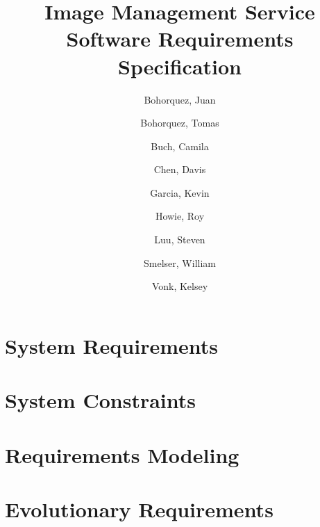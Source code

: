 \documentclass{article}
\begin{document}
\title{
  Image Management Service\\
  \large Software Requirements Specification
}
\author{
       Bohorquez, Juan
  \and Bohorquez, Tomas
  \and Buch, Camila
  \and Chen, Davis
  \and Garcia, Kevin
  \and Howie, Roy
  \and Luu, Steven
  \and Smelser, William
  \and Vonk, Kelsey
}
\date{}
\maketitle

\clearpage
  \tableofcontents

\clearpage
  \listoffigures
  \listoftables

\clearpage
\section{System Requirements}
  

\clearpage
\section{System Constraints}
  

\clearpage
\section{Requirements Modeling}
  

\clearpage
\section{Evolutionary Requirements}
  
\end{document}
